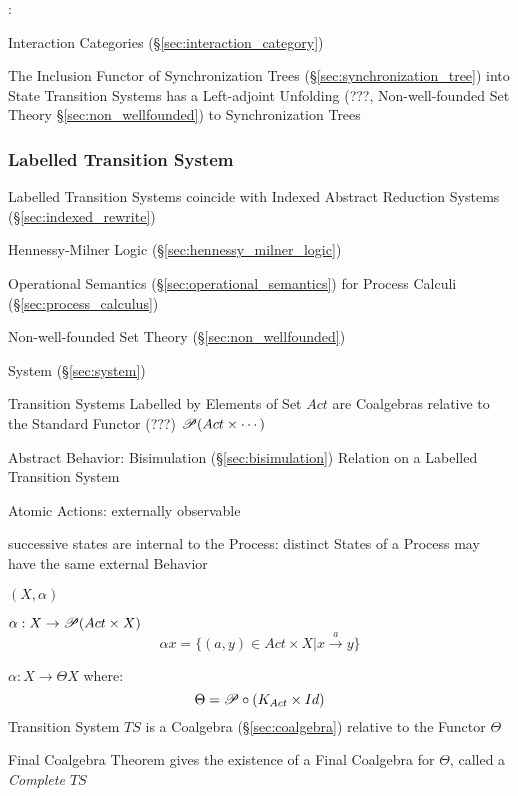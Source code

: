 \asterism


\cite{abramsky-gay-nagarajan96}:

Interaction Categories (\S\ref{sec:interaction_category})

The Inclusion Functor of Synchronization Trees
(\S\ref{sec:synchronization_tree}) into State Transition Systems has a
Left-adjoint Unfolding (???, Non-well-founded Set Theory
\S\ref{sec:non_wellfounded}) to Synchronization Trees



\subsubsection{Labelled Transition System}
\label{sec:labelled_transition}

Labelled Transition Systems coincide with Indexed Abstract Reduction
Systems (\S\ref{sec:indexed_rewrite})

Hennessy-Milner Logic (\S\ref{sec:hennessy_milner_logic})


Operational Semantics (\S\ref{sec:operational_semantics}) for Process
Calculi (\S\ref{sec:process_calculus})

Non-well-founded Set Theory (\S\ref{sec:non_wellfounded})

System (\S\ref{sec:system})

Transition Systems Labelled by Elements of Set $Act$ are Coalgebras
relative to the Standard Functor (???) $\mathscr{P}(Act \times \cdots)$
\cite{aczel88}

Abstract Behavior: Bisimulation (\S\ref{sec:bisimulation}) Relation on
a Labelled Transition System \cite{aczel88}

Atomic Actions: externally observable

successive states are internal to the Process: distinct States of a
Process may have the same external Behavior \cite{aczel88}

$(X,\alpha)$

$\alpha : X \rightarrow \mathscr{P}(Act \times X)$
\[
  \alpha x = \{(a,y) \in Act \times X | x \xrightarrow{a} y\}
\]

$\alpha : X \rightarrow \Theta X$ where:
\[
  \Theta = \mathscr{P} \circ (K_{Act} \times Id)
\]
Transition System $TS$ is a Coalgebra (\S\ref{sec:coalgebra}) relative
to the Functor $\Theta$

Final Coalgebra Theorem gives the existence of a Final Coalgebra for
$\Theta$, called a \emph{Complete $TS$}

